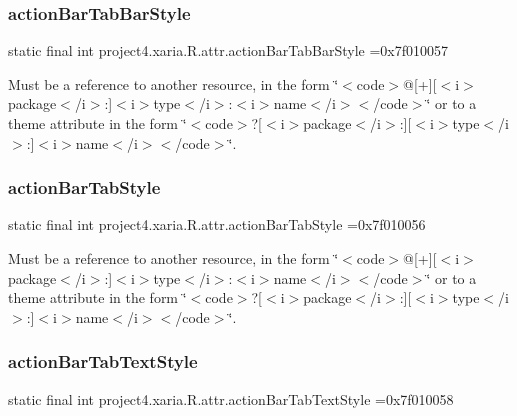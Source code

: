 \subsubsection{\texorpdfstring{action\+Bar\+Tab\+Bar\+Style}{actionBarTabBarStyle}}
{\footnotesize\ttfamily static final int project4.\+xaria.\+R.\+attr.\+action\+Bar\+Tab\+Bar\+Style =0x7f010057\hspace{0.3cm}{\ttfamily [static]}}

Must be a reference to another resource, in the form \char`\"{}$<$code$>$@\mbox{[}+\mbox{]}\mbox{[}$<$i$>$package$<$/i$>$\+:\mbox{]}$<$i$>$type$<$/i$>$\+:$<$i$>$name$<$/i$>$$<$/code$>$\char`\"{} or to a theme attribute in the form \char`\"{}$<$code$>$?\mbox{[}$<$i$>$package$<$/i$>$\+:\mbox{]}\mbox{[}$<$i$>$type$<$/i$>$\+:\mbox{]}$<$i$>$name$<$/i$>$$<$/code$>$\char`\"{}. \mbox{\label{classproject4_1_1xaria_1_1R_1_1attr_ae6920fe5addd68c49419ec4e6bfe97dd}} 
\subsubsection{\texorpdfstring{action\+Bar\+Tab\+Style}{actionBarTabStyle}}
{\footnotesize\ttfamily static final int project4.\+xaria.\+R.\+attr.\+action\+Bar\+Tab\+Style =0x7f010056\hspace{0.3cm}{\ttfamily [static]}}

Must be a reference to another resource, in the form \char`\"{}$<$code$>$@\mbox{[}+\mbox{]}\mbox{[}$<$i$>$package$<$/i$>$\+:\mbox{]}$<$i$>$type$<$/i$>$\+:$<$i$>$name$<$/i$>$$<$/code$>$\char`\"{} or to a theme attribute in the form \char`\"{}$<$code$>$?\mbox{[}$<$i$>$package$<$/i$>$\+:\mbox{]}\mbox{[}$<$i$>$type$<$/i$>$\+:\mbox{]}$<$i$>$name$<$/i$>$$<$/code$>$\char`\"{}. \mbox{\label{classproject4_1_1xaria_1_1R_1_1attr_a67187b7f7a328e711ba8465a8796b86d}} 
\subsubsection{\texorpdfstring{action\+Bar\+Tab\+Text\+Style}{actionBarTabTextStyle}}
{\footnotesize\ttfamily static final int project4.\+xaria.\+R.\+attr.\+action\+Bar\+Tab\+Text\+Style =0x7f010058\hspace{0.3cm}{\ttfamily [static]}}

